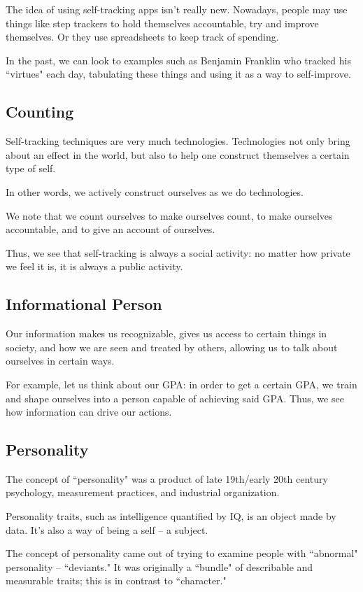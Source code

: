 \documentclass[openany]{book}
\begin{document}
The idea of using self-tracking apps isn't really new. Nowadays, people may use things like step trackers to hold themselves accountable, try and improve themselves. Or they use spreadsheets to keep track of spending.

In the past, we can look to examples such as Benjamin Franklin who tracked his ``virtues" each day, tabulating these things and using it as a way to self-improve.

\subsection{Counting}
Self-tracking techniques are very much technologies. Technologies not only bring about an effect in the world, but also to help one construct themselves a certain type of self.

In other words, we actively construct ourselves as we do technologies.

We note that we count ourselves to make ourselves count, to make ourselves accountable, and to give an account of ourselves.

Thus, we see that self-tracking is always a social activity: no matter how private we feel it is, it is always a public activity.

\subsection{Informational Person}
Our information makes us recognizable, gives us access to certain things in society, and how we are seen and treated by others, allowing us to talk about ourselves in certain ways.

For example, let us think about our GPA: in order to get a certain GPA, we train and shape ourselves into a person capable of achieving said GPA. Thus, we see how information can drive our actions.

\subsection{Personality}
The concept of ``personality" was a product of late 19th/early 20th century psychology, measurement practices, and industrial organization.

Personality traits, such as intelligence quantified by IQ, is an object made by data. It's also a way of being a self -- a subject.

The concept of personality came out of trying to examine people with ``abnormal" personality -- ``deviants." It was originally a ``bundle" of describable and measurable traits; this is in contrast to ``character."
\end{document}
